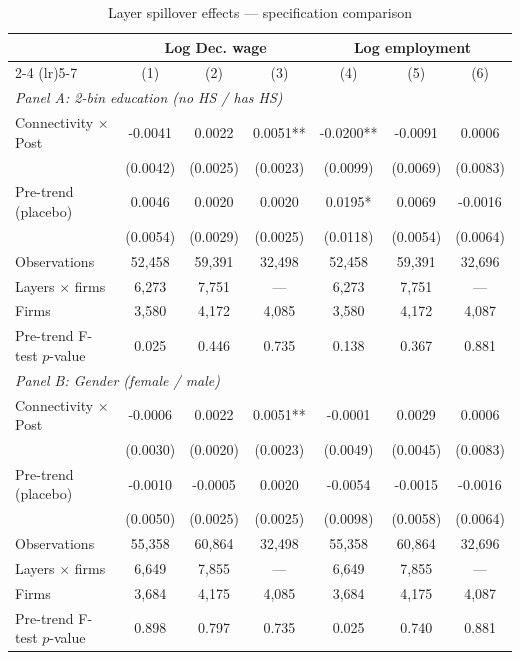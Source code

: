 \begin{table}[H]
\centering
\caption{Layer spillover effects --- specification comparison}
\label{tab:layer_specs_firm}
\scriptsize
\begin{threeparttable}
\begin{tabular}{lcccccc}
\toprule\toprule
 & \multicolumn{3}{c}{Log Dec. wage} & \multicolumn{3}{c}{Log employment} \\
\cmidrule(lr){2-4} \cmidrule(lr){5-7}
 & (1) & (2) & (3) & (4) & (5) & (6) \\
\midrule
\multicolumn{7}{l}{\textit{Panel A: 2-bin education (no HS / has HS)}} \\
\quad Connectivity $\times$ Post & -0.0041 & 0.0022 & 0.0051** & -0.0200** & -0.0091 & 0.0006 \\
 & (0.0042) & (0.0025) & (0.0023) & (0.0099) & (0.0069) & (0.0083) \\
\quad Pre-trend (placebo) & 0.0046 & 0.0020 & 0.0020 & 0.0195* & 0.0069 & -0.0016 \\
 & (0.0054) & (0.0029) & (0.0025) & (0.0118) & (0.0054) & (0.0064) \\
\quad Observations & 52,458 & 59,391 & 32,498 & 52,458 & 59,391 & 32,696 \\
\quad Layers $\times$ firms & 6,273 & 7,751 & --- & 6,273 & 7,751 & --- \\
\quad Firms & 3,580 & 4,172 & 4,085 & 3,580 & 4,172 & 4,087 \\
\quad Pre-trend F-test $p$-value & 0.025 & 0.446 & 0.735 & 0.138 & 0.367 & 0.881 \\[6pt]
\multicolumn{7}{l}{\textit{Panel B: Gender (female / male)}} \\
\quad Connectivity $\times$ Post & -0.0006 & 0.0022 & 0.0051** & -0.0001 & 0.0029 & 0.0006 \\
 & (0.0030) & (0.0020) & (0.0023) & (0.0049) & (0.0045) & (0.0083) \\
\quad Pre-trend (placebo) & -0.0010 & -0.0005 & 0.0020 & -0.0054 & -0.0015 & -0.0016 \\
 & (0.0050) & (0.0025) & (0.0025) & (0.0098) & (0.0058) & (0.0064) \\
\quad Observations & 55,358 & 60,864 & 32,498 & 55,358 & 60,864 & 32,696 \\
\quad Layers $\times$ firms & 6,649 & 7,855 & --- & 6,649 & 7,855 & --- \\
\quad Firms & 3,684 & 4,175 & 4,085 & 3,684 & 4,175 & 4,087 \\
\quad Pre-trend F-test $p$-value & 0.898 & 0.797 & 0.735 & 0.025 & 0.740 & 0.881 \\[6pt]

\end{tabular}
\end{threeparttable}
\end{table}
